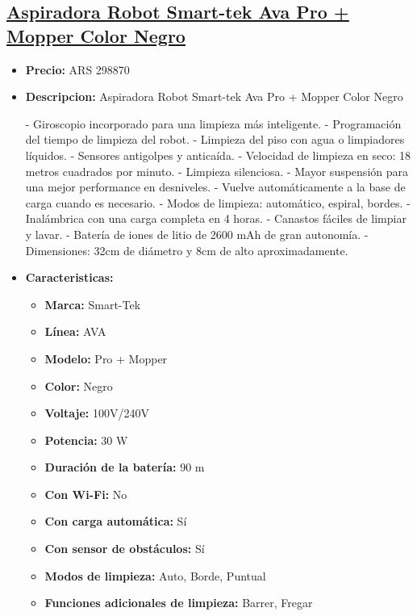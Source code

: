 \documentclass{article}
\begin{document}
    
    \begin{adjustwidth}{2em}{}

    \subsection{\underline{\href{https://www.mercadolibre.com.ar/aspiradora-robot-smart-tek-ava-pro-mopper-color-negro/p/MLA18057548}{Aspiradora Robot Smart-tek Ava Pro + Mopper Color Negro}}}
    \begin{itemize}
        \item \textbf{Precio:} ARS 298870
        \item \textbf{Descripcion:} Aspiradora Robot Smart-tek Ava Pro + Mopper Color Negro

- Giroscopio incorporado para una limpieza más inteligente.
- Programación del tiempo de limpieza del robot.
- Limpieza del piso con agua o limpiadores líquidos.
- Sensores antigolpes y anticaída.
- Velocidad de limpieza en seco: 18 metros cuadrados por minuto.
- Limpieza silenciosa.
- Mayor suspensión para una mejor performance en desniveles.
- Vuelve automáticamente a la base de carga cuando es necesario.
- Modos de limpieza: automático, espiral, bordes.
- Inalámbrica con una carga completa en 4 horas.
- Canastos fáciles de limpiar y lavar.
- Batería de iones de litio de 2600 mAh de gran autonomía.
- Dimensiones: 32cm de diámetro y 8cm de alto aproximadamente.
        \item \textbf{Caracteristicas:} 
        \begin{itemize}
            \item \textbf {Marca:} Smart-Tek
    \item \textbf {Línea:} AVA
    \item \textbf {Modelo:} Pro + Mopper
    \item \textbf {Color:} Negro
    \item \textbf {Voltaje:} 100V/240V
    \item \textbf {Potencia:} 30 W
    \item \textbf {Duración de la batería:} 90 m
    \item \textbf {Con Wi-Fi:} No
    \item \textbf {Con carga automática:} Sí
    \item \textbf {Con sensor de obstáculos:} Sí
    \item \textbf {Modos de limpieza:} Auto, Borde, Puntual
    \item \textbf {Funciones adicionales de limpieza:} Barrer, Fregar

\end{itemize}
\end{itemize}
\end{adjustwidth}
\end{document}
